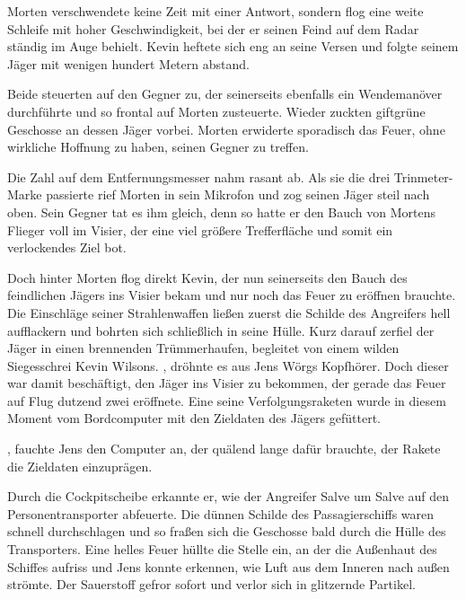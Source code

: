 \par

Morten verschwendete keine Zeit mit einer Antwort, sondern flog eine weite Schleife mit hoher Geschwindigkeit, bei der er seinen Feind auf dem Radar ständig im Auge behielt. Kevin heftete sich eng an seine Versen und folgte seinem Jäger mit wenigen hundert Metern abstand.

\par

Beide steuerten auf den Gegner zu, der seinerseits ebenfalls ein Wendemanöver durchführte und so frontal auf Morten zusteuerte. Wieder zuckten giftgrüne Geschosse an dessen Jäger vorbei. Morten erwiderte sporadisch das Feuer, ohne wirkliche Hoffnung zu haben, seinen Gegner zu treffen.

\par

Die Zahl auf dem Entfernungsmesser nahm rasant ab. Als sie die drei Trinmeter-Marke passierte rief Morten  in sein Mikrofon und zog seinen Jäger steil nach oben. Sein Gegner tat es ihm gleich, denn so hatte er den Bauch von Mortens Flieger voll im Visier, der eine viel größere Trefferfläche und somit ein verlockendes Ziel bot.

\par

Doch hinter Morten flog direkt Kevin, der nun seinerseits den Bauch des feindlichen Jägers ins Visier bekam und nur noch das Feuer zu eröffnen brauchte. Die Einschläge seiner Strahlenwaffen ließen zuerst die Schilde des Angreifers hell aufflackern und bohrten sich schließlich in seine Hülle. Kurz darauf zerfiel der Jäger in einen brennenden Trümmerhaufen, begleitet von einem wilden Siegesschrei Kevin Wilsons.
\ortswechsel
{}, dröhnte es aus Jens Wörgs Kopfhörer. Doch dieser war damit beschäftigt, den Jäger ins Visier zu bekommen, der gerade das Feuer auf Flug dutzend zwei eröffnete. Eine seine Verfolgungsraketen wurde in diesem Moment vom Bordcomputer mit den Zieldaten des Jägers gefüttert.

\par

, fauchte Jens den Computer an, der quälend lange dafür brauchte, der Rakete die Zieldaten einzuprägen.

\par

Durch die Cockpitscheibe erkannte er, wie der Angreifer Salve um Salve auf den Personentransporter abfeuerte. Die dünnen Schilde des Passagierschiffs waren schnell durchschlagen und so fraßen sich die Geschosse bald durch die Hülle des Transporters. Eine helles Feuer hüllte die Stelle ein, an der die Außenhaut des Schiffes aufriss und Jens konnte erkennen, wie Luft aus dem Inneren nach außen strömte. Der Sauerstoff gefror sofort und verlor sich in glitzernde Partikel.

